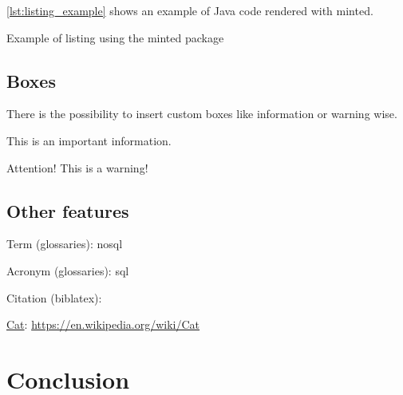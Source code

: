 \autoref{lst:listing_example} shows an example of Java code rendered with minted.

\begin{listing}[H]
    \caption{Example of listing using the minted package}
    \label{lst:listing_example}
\end{listing}

\subsection{Boxes}

There is the possibility to insert custom boxes like  information or warning wise.

\begin{info}
    This is an important information.
\end{info}

\begin{warning}
    Attention! This is a warning!
\end{warning}

\subsection{Other features}

Term (glossaries): \gls{nosql}

Acronym (glossaries): \gls{sql}

Citation (biblatex): \cite{paper_millwheel}

\href{https://en.wikipedia.org/wiki/Cat}{Cat}: 
\url{https://en.wikipedia.org/wiki/Cat}

\section{Conclusion}

\blindtext

